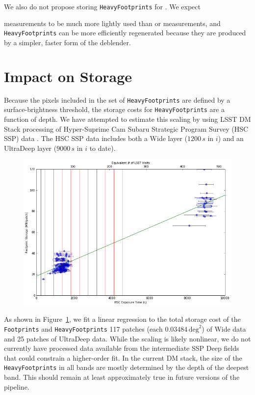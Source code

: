\documentclass[DM,lsstdraft,toc]{lsstdoc}
\begin{document}
We also do not propose storing \texttt{HeavyFootprints} for \Source.  We expect {\Source measurements to be much more lightly used than \Object or \ForcedSource measurements, and \Source \texttt{HeavyFootprints} can be more efficiently regenerated because they are produced by a simpler, faster form of the deblender.

\section{Impact on Storage}

Because the pixels included in the set of \texttt{HeavyFootprints} are defined by a surface-brightness threshold, the storage costs for \texttt{HeavyFootprints} are a function of depth.  We have attempted to estimate this scaling by using LSST DM Stack processing of Hyper-Suprime Cam Subaru Strategic Program Survey (HSC SSP) data \citep{2017arXiv170208449A}.  The HSC SSP data includes both a Wide layer ($1200\,s$ in $i$) and an UltraDeep layer ($9000\,s$ in $i$ to date).

\begin{figure}
\includegraphics[width=\textwidth]{regression.png}
\label{fig:regression}
\end{figure}


As shown in Figure~\ref{fig:regression}, we fit a linear regression to the total storage cost of the \texttt{Footprints} and \texttt{HeavyFootprints} 117 patches (each $0.03484\,\mathrm{deg}^2$) of Wide data and 25 patches of UltraDeep data.  While the scaling is likely nonlinear, we do not currently have processed data available from the intermediate SSP Deep fields that could constrain a higher-order fit.  In the current DM stack, the size of the \texttt{HeavyFootprints} in all bands are mostly determined by the depth of the deepest band.  This should remain at least approximately true in future versions of the pipeline.

}
\end{document}
